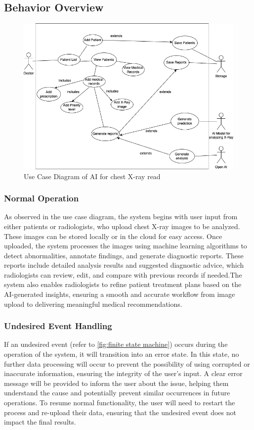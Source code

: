 \documentclass[12pt]{article}
\begin{document}
\subsection{Behavior Overview}
\begin{figure}[H] 
  \centering
  \includegraphics[width=1\linewidth]{UseCase.png}
  \caption{Use Case Diagram of AI for chest X-ray read}
  \label{fig:use-case-diagram}
\end{figure}
\vspace{-5em} 
\newpage
\subsubsection{Normal Operation}
As observed in the use case diagram, the system begins with user input from either patients or radiologists, who upload chest X-ray images to be analyzed. These images can be stored locally or in the cloud for easy access. Once uploaded, the system processes the images using machine learning algorithms to detect abnormalities, annotate findings, and generate diagnostic reports. These reports include detailed analysis results and suggested diagnostic advice, which radiologists can review, edit, and compare with previous records if needed.The system also enables radiologists to refine patient treatment plans based on the AI-generated insights, ensuring a smooth and accurate workflow from image upload to delivering meaningful medical recommendations.
\subsubsection{Undesired Event Handling}
If an undesired event (refer to \ref{fig:finite state machine}) occurs during the operation of the system, it will transition into an error state. In this state, no further data processing will occur to prevent the possibility of using corrupted or inaccurate information, ensuring the integrity of the user's input. A clear error message will be provided to inform the user about the issue, helping them understand the cause and potentially prevent similar occurrences in future operations. To resume normal functionality, the user will need to restart the process and re-upload their data, ensuring that the undesired event does not impact the final results.
\end{document}
